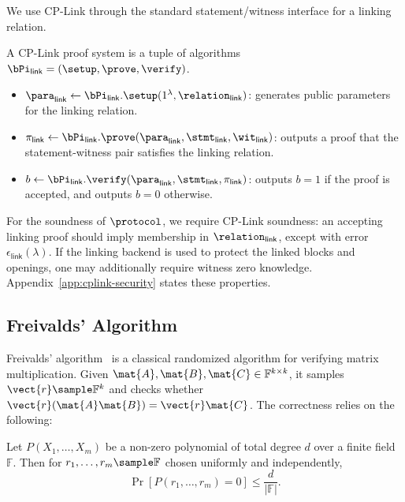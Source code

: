 We use CP-Link through the standard statement/witness interface for a linking
relation.

A CP-Link proof system is a tuple of algorithms
$\bPi_{\mathsf{link}}=(\setup,\prove,\verify)$.

\begin{itemize}
\item $\para_{\mathsf{link}} \gets
\bPi_{\mathsf{link}}.\setup(1^\lambda,\relation_{\mathsf{link}})$:
generates public parameters for the linking relation.

\item $\pi_{\mathsf{link}} \gets
\bPi_{\mathsf{link}}.\prove(
\para_{\mathsf{link}},
\stmt_{\mathsf{link}},
\wit_{\mathsf{link}})$:
outputs a proof that the statement-witness pair satisfies the linking relation.

\item $b \gets
\bPi_{\mathsf{link}}.\verify(
\para_{\mathsf{link}},
\stmt_{\mathsf{link}},
\pi_{\mathsf{link}})$:
outputs $b=1$ if the proof is accepted, and outputs $b=0$ otherwise.
\end{itemize}

\begin{remark}
For the soundness of \(\protocol\), we require CP-Link soundness: an accepting
linking proof should imply membership in \(\relation_{\mathsf{link}}\), except
with error \(\epsilon_{\mathsf{link}}(\lambda)\).  If the linking backend is used
to protect the linked blocks and openings, one may additionally require witness
zero knowledge.  Appendix~\ref{app:cplink-security} states these properties.
\end{remark}

\subsection{Freivalds' Algorithm}
\label{sec:prelim-freivalds}

Freivalds' algorithm~\cite{freivalds1977probabilistic} is a classical randomized algorithm for verifying matrix multiplication.
Given $\mat{A}, \mat{B}, \mat{C} \in \mathbb{F}^{k \times k}$, it samples $\vect{r} \sample \mathbb{F}^k$ and checks whether $\vect{r}(\mat{A}\mat{B}) = \vect{r}\mat{C}$.
The correctness relies on the following:

\begin{lemma}\label{lem:sz}
Let $P(X_1, \ldots, X_m)$ be a non-zero polynomial of total degree $d$ over a finite field $\mathbb{F}$.
Then for $r_1, \ldots, r_m \sample \mathbb{F}$ chosen uniformly and independently,
\[
\Pr[P(r_1, \ldots, r_m) = 0] \le \frac{d}{|\mathbb{F}|}.
\]
\end{lemma}

